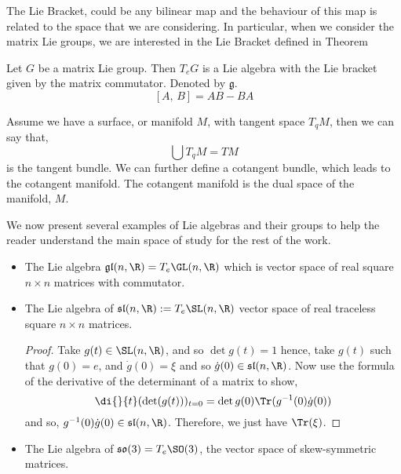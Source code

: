\noindent
The Lie Bracket, could be any bilinear map and the behaviour of this map is related to the space that we are considering. In particular, when we consider the matrix Lie groups, we are interested in the Lie Bracket defined in Theorem 

\begin{nthm}\label{ref:LBthm}
  Let $G$ be a matrix Lie group. Then $T_eG$ is a Lie algebra with the Lie bracket given by the matrix commutator. Denoted by $\mathfrak{g}$.
  $$ [A,\, B] = AB - BA $$
\end{nthm}

\noindent
Assume we have a surface, or manifold $M$, with tangent space $T_qM$, then we can say that,
$$ \bigcup T_qM = TM $$
is the tangent bundle. We can further define a cotangent bundle, which leads to the cotangent manifold. The cotangent manifold is the dual space of the manifold, $M$.\newpage

\noindent
We now present several examples of Lie algebras and their groups to help the reader understand the main space of study for the rest of the work.

\begin{eg}
  \begin{itemize}
    \item The Lie algebra $\mathfrak{gl}(n, \R) = T_e\GL(n, \R)$ which is vector space of real square $n \times n$ matrices with commutator.
    \item The Lie algebra of $\mathfrak{sl}(n, \R) := T_e \SL(n, \R)$ vector space of real traceless square $n \times n$ matrices.
    \begin{proof}
      Take $g(t) \in \SL(n, \R)$, and so $\det g(t) = 1$ hence, take $g(t)$ such that $g(0) = e$, and $\dot g(0) = \xi$ and so $\dot g(0) \in \mathfrak{sl}(n, \R)$. Now use the formula of the derivative of the determinant of a matrix to show,
      $$ \di {}{t} (\det (g(t)))_{t=0} = \det {g(0)}\Tr(g^{-1}(0)\dot g(0)) $$
      and so, $g^{-1}(0)\dot g(0) \in \mathfrak{sl}(n, \R)$. Therefore, we just have $\Tr (\xi)$.
    \end{proof}
    \item The Lie algebra of $\mathfrak{so}(3) = T_e\SO(3)$, the vector space of skew-symmetric matrices.
  \end{itemize}
\end{eg}


